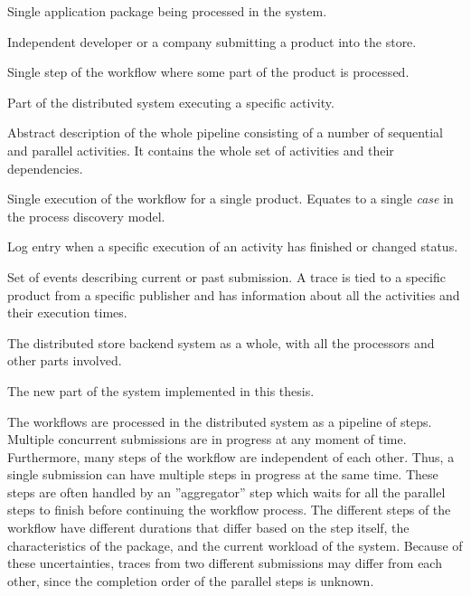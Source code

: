 \documentclass[english,12pt,a4paper,pdftex,sci,utf8]{aaltothesis}
\theoremstyle{definition}
\begin{document}

\begin{description}[style=nextline]
\item[Product] 
Single application package being processed in the system. 

\item[Publisher] 
Independent developer or a company submitting a product into the store.

\item[Activity] 
Single step of the workflow where some part of the product is processed. 

\item[Processor] 
Part of the distributed system executing a specific activity.

\item[Workflow]
Abstract description of the whole pipeline consisting of a number of sequential and parallel activities. It contains the whole set of activities and their dependencies.

\item[Submission] 
Single execution of the workflow for a single product. Equates to a single \emph{case} in the process discovery model.

\item[Event] 
Log entry when a specific execution of an activity has finished or changed status. 

\item[Trace] 
Set of events describing current or past submission. 
A trace is tied to a specific product from a specific publisher and has information about all the activities and their execution times. 

\item[System] 
The distributed store backend system as a whole, with all the processors and other parts involved.

\item[Project] 
The new part of the system implemented in this thesis.

\label{desc:termdefinitions}
\end{description}


The workflows are processed in the distributed system as a pipeline of steps. 
Multiple concurrent submissions are in progress at any moment of time.
Furthermore, many steps of the workflow are independent of each other.
Thus, a single submission can have multiple steps in progress at the same time.
These steps are often handled by an ''aggregator'' step which waits for 
all the parallel steps to finish before continuing the workflow process.
The different steps of the workflow have different durations that differ based on
the step itself, the characteristics of the package, and the current workload of the system.
Because of these uncertainties, traces from two different submissions may differ from each other, 
since the completion order of the parallel steps is unknown.
\end{document}
